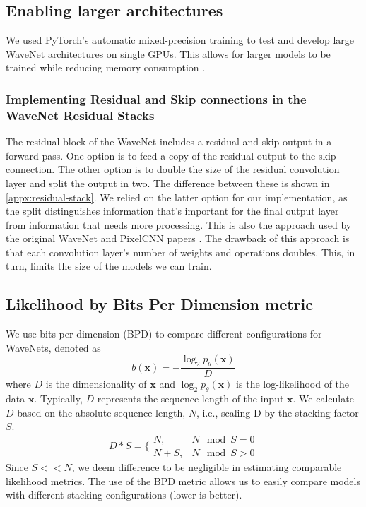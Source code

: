 \subsection{Enabling larger architectures}
We used PyTorch's automatic mixed-precision training to test and develop large WaveNet architectures on single GPUs. 
This allows for larger models to be trained while reducing memory consumption \cite{micikevicius_mixed_2018}.


\subsubsection{Implementing Residual and Skip connections in the WaveNet Residual Stacks}
The residual block of the WaveNet includes a residual and skip output in a forward pass. 
One option is to feed a copy of the residual output to the skip connection. 
The other option is to double the size of the residual convolution layer and split the output in two. 
The difference between these is shown in \cref{appx:residual-stack}. 
We relied on the latter option for our implementation, as the split distinguishes information that's important for the final output layer from information that needs more processing. 
This is also the approach used by the original WaveNet and PixelCNN papers \cite{salimans_pixelcnn_2017, oord_wavenet_2016}. 
The drawback of this approach is that each convolution layer's number of weights and operations doubles.
This, in turn, limits the size of the models we can train. 

\subsection{Likelihood by Bits Per Dimension metric}
We use bits per dimension (BPD) to compare different configurations for WaveNets, denoted as
\begin{equation}
    b(\mathbf{x}) = - \frac{\log_2 p_\theta(\mathbf{x}) }{D}
    \label{eq:bpd}
\end{equation}
where $D$ is the dimensionality of $\mathbf{x}$ and $\log_2 p_\theta(\mathbf{x})$ is the log-likelihood of the data $\mathbf{x}$. \cite{papamakarios_masked_2018} 
Typically, $D$ represents the sequence length of the input $\mathbf{x}$. 
We calculate $D$ based on the absolute sequence length, $N$, i.e., scaling D by the stacking factor $S$.
\begin{equation*}
D*S = \{\begin{array}{cc}
    N,   & N \mod S = 0 \\
    N+S, & N \mod S > 0
\end{array}
\end{equation*}
Since $S << N$, we deem difference to be negligible in estimating comparable likelihood metrics. 
The use of the BPD metric allows us to easily compare models with different stacking configurations (lower is better). 

